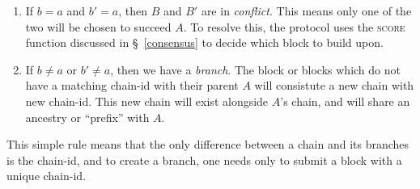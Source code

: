 \begin{enumerate}
    \item If $b = a$ and $b' = a$, then $B$ and $B'$ are in \emph{conflict}.
        This means only one of the two will be chosen to succeed $A$. To
        resolve this, the protocol uses the \textsc{score} function discussed
        in \S~\ref{consensus} to decide which block to build upon.
    \item If $b \neq a$ or $b' \neq a$, then we have a \emph{branch}. The block
        or blocks which do not have a matching chain-id with their parent $A$
        will consistute a new chain with new chain-id. This new chain will
        exist alongside $A$'s chain, and will share an ancestry or ``prefix''
        with $A$.
\end{enumerate}

This simple rule means that the only difference between a chain and its branches
is the chain-id, and to create a branch, one needs only to submit a block with
a unique chain-id.



